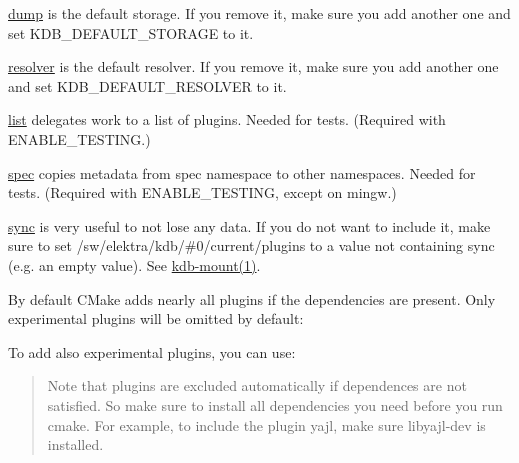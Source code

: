 \begin{DoxyItemize}
\item \mbox{\hyperlink{autotoc_md198_src_plugins_dump_README_md}{dump}} is the default storage. If you remove it, make sure you add another one and set {\ttfamily K\+D\+B\+\_\+\+D\+E\+F\+A\+U\+L\+T\+\_\+\+S\+T\+O\+R\+A\+GE} to it.
\item \mbox{\hyperlink{autotoc_md618_src_plugins_resolver_README_md}{resolver}} is the default resolver. If you remove it, make sure you add another one and set {\ttfamily K\+D\+B\+\_\+\+D\+E\+F\+A\+U\+L\+T\+\_\+\+R\+E\+S\+O\+L\+V\+ER} to it.
\item \mbox{\hyperlink{autotoc_md384_src_plugins_list_README_md}{list}} delegates work to a list of plugins. Needed for tests. (Required with {\ttfamily E\+N\+A\+B\+L\+E\+\_\+\+T\+E\+S\+T\+I\+NG}.)
\item \mbox{\hyperlink{autotoc_md644_src_plugins_spec_README_md}{spec}} copies metadata from spec namespace to other namespaces. Needed for tests. (Required with {\ttfamily E\+N\+A\+B\+L\+E\+\_\+\+T\+E\+S\+T\+I\+NG}, except on mingw.)
\item \mbox{\hyperlink{autotoc_md663_src_plugins_sync_README_md}{sync}} is very useful to not lose any data. If you do not want to include it, make sure to set {\ttfamily /sw/elektra/kdb/\#0/current/plugins} to a value not containing sync (e.\+g. an empty value). See \mbox{\hyperlink{doc_help_kdb-mount_md}{kdb-\/mount(1)}}.
\end{DoxyItemize}

By default C\+Make adds nearly all plugins if the dependencies are present. Only experimental plugins will be omitted by default\+:


\begin{DoxyCode}{0}
\end{DoxyCode}


To add also experimental plugins, you can use\+:


\begin{DoxyCode}{0}
\end{DoxyCode}


\begin{quote}
Note that plugins are excluded automatically if dependences are not satisfied. So make sure to install all dependencies you need before you run {\ttfamily cmake}. For example, to include the plugin {\ttfamily yajl}, make sure {\ttfamily libyajl-\/dev} is installed. \end{quote}


